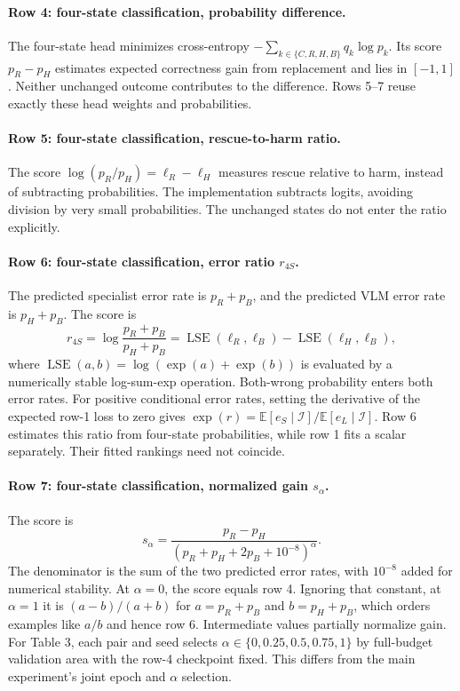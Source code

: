 \paragraph{Row 4: four-state classification, probability difference.}
The four-state head minimizes cross-entropy $-\sum_{k\in\{C,R,H,B\}}q_k\log p_k$. Its score $p_R-p_H$ estimates expected correctness gain from replacement and lies in $[-1,1]$. Neither unchanged outcome contributes to the difference. Rows 5--7 reuse exactly these head weights and probabilities.

\paragraph{Row 5: four-state classification, rescue-to-harm ratio.}
The score $\log(p_R/p_H)=\ell_R-\ell_H$ measures rescue relative to harm, instead of subtracting probabilities. The implementation subtracts logits, avoiding division by very small probabilities. The unchanged states do not enter the ratio explicitly.

\paragraph{Row 6: four-state classification, error ratio $r_{4S}$.}
The predicted specialist error rate is $p_R+p_B$, and the predicted VLM error rate is $p_H+p_B$. The score is
\[
r_{4S}=\log\frac{p_R+p_B}{p_H+p_B}
=\operatorname{LSE}(\ell_R,\ell_B)-\operatorname{LSE}(\ell_H,\ell_B),
\]
where $\operatorname{LSE}(a,b)=\log(\exp(a)+\exp(b))$ is evaluated by a numerically stable log-sum-exp operation. Both-wrong probability enters both error rates. For positive conditional error rates, setting the derivative of the expected row-1 loss to zero gives $\exp(r)=\mathbb E[e_S\mid\mathcal I]/\mathbb E[e_L\mid\mathcal I]$. Row 6 estimates this ratio from four-state probabilities, while row 1 fits a scalar separately. Their fitted rankings need not coincide.

\paragraph{Row 7: four-state classification, normalized gain $s_\alpha$.}
The score is
\[
s_\alpha=\frac{p_R-p_H}{(p_R+p_H+2p_B+10^{-8})^\alpha}.
\]
The denominator is the sum of the two predicted error rates, with $10^{-8}$ added for numerical stability. At $\alpha=0$, the score equals row 4. Ignoring that constant, at $\alpha=1$ it is $(a-b)/(a+b)$ for $a=p_R+p_B$ and $b=p_H+p_B$, which orders examples like $a/b$ and hence row 6. Intermediate values partially normalize gain. For Table 3, each pair and seed selects $\alpha\in\{0,0.25,0.5,0.75,1\}$ by full-budget validation area with the row-4 checkpoint fixed. This differs from the main experiment's joint epoch and $\alpha$ selection.

